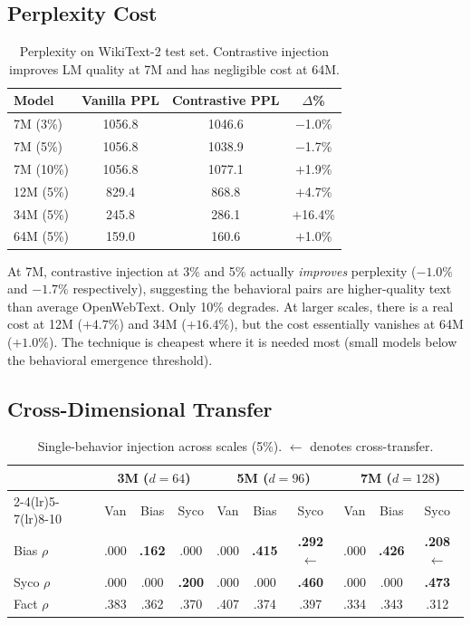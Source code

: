 \documentclass[11pt]{article}
\begin{document}
\subsection{Perplexity Cost}

\begin{table}[t]
\centering
\caption{Perplexity on WikiText-2 test set. Contrastive injection improves LM quality at 7M and has negligible cost at 64M.}
\label{tab:ppl}
\begin{tabular}{lccc}
\toprule
Model & Vanilla PPL & Contrastive PPL & $\Delta$\% \\
\midrule
7M (3\%)  & 1056.8 & 1046.6 & $-$1.0\% \\
7M (5\%)  & 1056.8 & 1038.9 & $-$1.7\% \\
7M (10\%) & 1056.8 & 1077.1 & $+$1.9\% \\
12M (5\%) & 829.4  & 868.8  & $+$4.7\% \\
34M (5\%) & 245.8  & 286.1  & $+$16.4\% \\
64M (5\%) & 159.0  & 160.6  & $+$1.0\% \\
\bottomrule
\end{tabular}
\end{table}

At 7M, contrastive injection at 3\% and 5\% actually \emph{improves} perplexity ($-1.0\%$ and $-1.7\%$ respectively), suggesting the behavioral pairs are higher-quality text than average OpenWebText. Only 10\% degrades. At larger scales, there is a real cost at 12M ($+4.7\%$) and 34M ($+16.4\%$), but the cost essentially vanishes at 64M ($+1.0\%$). The technique is cheapest where it is needed most (small models below the behavioral emergence threshold).

\subsection{Cross-Dimensional Transfer}

\begin{table}[t]
\centering
\caption{Single-behavior injection across scales (5\%). $\leftarrow$ denotes cross-transfer.}
\label{tab:transfer}
\begin{tabular}{lccccccccc}
\toprule
 & \multicolumn{3}{c}{3M ($d{=}64$)} & \multicolumn{3}{c}{5M ($d{=}96$)} & \multicolumn{3}{c}{7M ($d{=}128$)} \\
\cmidrule(lr){2-4}\cmidrule(lr){5-7}\cmidrule(lr){8-10}
 & Van & Bias & Syco & Van & Bias & Syco & Van & Bias & Syco \\
\midrule
Bias $\rho$ & .000 & \textbf{.162} & .000 & .000 & \textbf{.415} & \textbf{.292}$\leftarrow$ & .000 & \textbf{.426} & \textbf{.208}$\leftarrow$ \\
Syco $\rho$ & .000 & .000 & \textbf{.200} & .000 & .000 & \textbf{.460} & .000 & .000 & \textbf{.473} \\
Fact $\rho$ & .383 & .362 & .370 & .407 & .374 & .397 & .334 & .343 & .312 \\
\bottomrule
\end{tabular}
\end{table}
\end{document}
